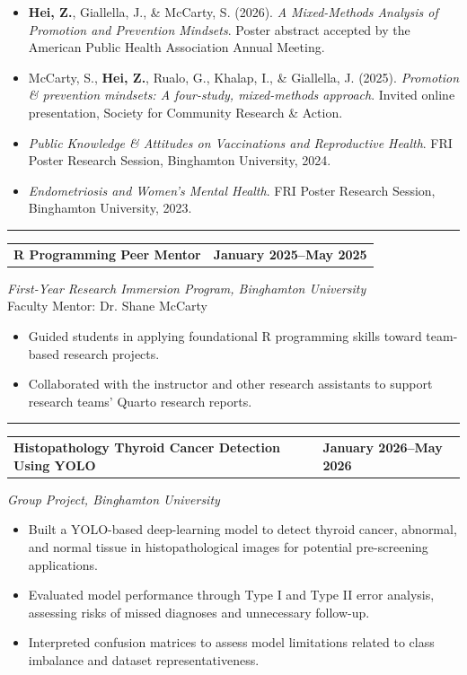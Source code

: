 \documentclass[
  9.5pt,
]{article}
\makeatletter
\providecommand{\tightlist}{%
  \setlength{\itemsep}{0pt}\setlength{\parskip}{0pt}}
\newcommand{\cvsection}[1]{\vspace{5pt}{\large\bfseries\color{cvpurple}#1}\vspace{1pt}\hrule\vspace{3pt}}
\newcommand{\cventry}[4]{%
  \begin{tabularx}{\textwidth}{@{}>{\raggedright\arraybackslash}X>{\raggedleft\arraybackslash}p{1.65in}@{}}
  \textbf{#1} & \textbf{#2}\\
  \end{tabularx}
  \textit{#3}\\[-1pt]
  {\small\color{cvpurple}#4}\vspace{-2pt}}
\makeatother
\begin{document}
\begin{itemize}
\tightlist
\item
  \textbf{Hei, Z.}, Giallella, J., \& McCarty, S. (2026). \emph{A
  Mixed-Methods Analysis of Promotion and Prevention Mindsets}. Poster
  abstract accepted by the American Public Health Association Annual
  Meeting.
\item
  McCarty, S., \textbf{Hei, Z.}, Rualo, G., Khalap, I., \& Giallella, J.
  (2025). \emph{Promotion \& prevention mindsets: A four-study,
  mixed-methods approach}. Invited online presentation, Society for
  Community Research \& Action.
\item
  \emph{Public Knowledge \& Attitudes on Vaccinations and Reproductive
  Health}. FRI Poster Research Session, Binghamton University, 2024.
\item
  \emph{Endometriosis and Women's Mental Health}. FRI Poster Research
  Session, Binghamton University, 2023.
\end{itemize}

\cvsection{MENTORING}
\cventry{R Programming Peer Mentor}{January 2025--May 2025}{First-Year Research Immersion Program, Binghamton University}{Faculty Mentor: Dr. Shane McCarty}

\begin{itemize}
\tightlist
\item
  Guided students in applying foundational R programming skills toward
  team-based research projects.
\item
  Collaborated with the instructor and other research assistants to
  support research teams' Quarto research reports.
\end{itemize}

\cvsection{TECHNICAL PROJECTS}
\cventry{Histopathology Thyroid Cancer Detection Using YOLO}{January 2026--May 2026}{Group Project, Binghamton University}{}

\begin{itemize}
\tightlist
\item
  Built a YOLO-based deep-learning model to detect thyroid cancer,
  abnormal, and normal tissue in histopathological images for potential
  pre-screening applications.
\item
  Evaluated model performance through Type I and Type II error analysis,
  assessing risks of missed diagnoses and unnecessary follow-up.
\item
  Interpreted confusion matrices to assess model limitations related to
  class imbalance and dataset representativeness.
\end{itemize}
\end{document}
